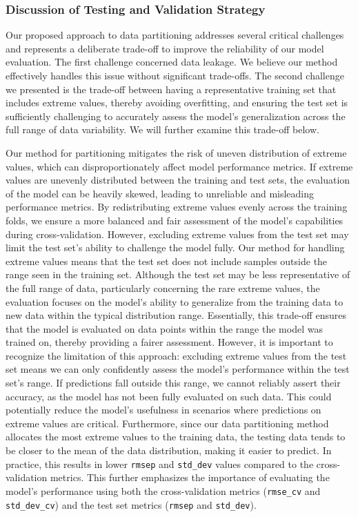 \subsubsection{Discussion of Testing and Validation Strategy}
Our proposed approach to data partitioning addresses several critical challenges and represents a deliberate trade-off to improve the reliability of our model evaluation.
The first challenge concerned data leakage. We believe our method effectively handles this issue without significant trade-offs.
The second challenge we presented is the trade-off between having a representative training set that includes extreme values, thereby avoiding overfitting, and ensuring the test set is sufficiently challenging to accurately assess the model's generalization across the full range of data variability.
We will further examine this trade-off below.

Our method for partitioning mitigates the risk of uneven distribution of extreme values, which can disproportionately affect model performance metrics.
If extreme values are unevenly distributed between the training and test sets, the evaluation of the model can be heavily skewed, leading to unreliable and misleading performance metrics.
By redistributing extreme values evenly across the training folds, we ensure a more balanced and fair assessment of the model's capabilities during cross-validation.
However, excluding extreme values from the test set may limit the test set's ability to challenge the model fully.
Our method for handling extreme values means that the test set does not include samples outside the range seen in the training set.
Although the test set may be less representative of the full range of data, particularly concerning the rare extreme values, the evaluation focuses on the model's ability to generalize from the training data to new data within the typical distribution range.
Essentially, this trade-off ensures that the model is evaluated on data points within the range the model was trained on, thereby providing a fairer assessment.
However, it is important to recognize the limitation of this approach: excluding extreme values from the test set means we can only confidently assess the model's performance within the test set's range.
If predictions fall outside this range, we cannot reliably assert their accuracy, as the model has not been fully evaluated on such data.
This could potentially reduce the model's usefulness in scenarios where predictions on extreme values are critical.
Furthermore, since our data partitioning method allocates the most extreme values to the training data, the testing data tends to be closer to the mean of the data distribution, making it easier to predict.
In practice, this results in lower \texttt{rmsep} and \texttt{std\_dev} values compared to the cross-validation metrics.
This further emphasizes the importance of evaluating the model's performance using both the cross-validation metrics (\texttt{rmse\_cv} and \texttt{std\_dev\_cv}) and the test set metrics (\texttt{rmsep} and \texttt{std\_dev}).

